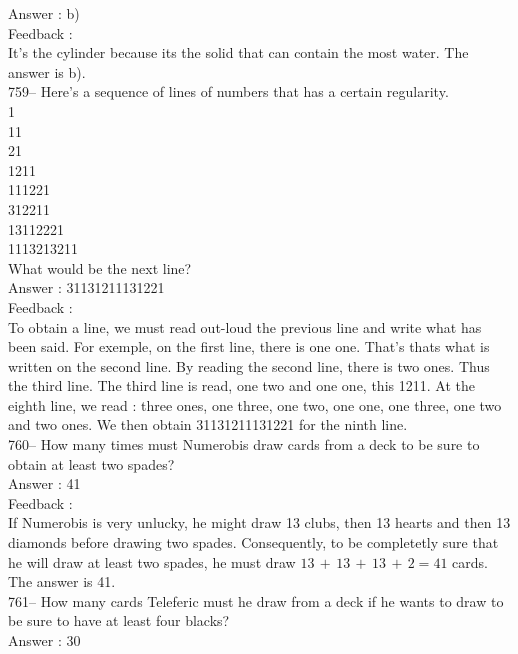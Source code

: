 \documentclass[letterpaper, 12pt]{article}
\begin{document}
Answer : b)\\

Feedback : \\
It's the cylinder because its the solid that can contain the most water.  The answer is b).\\

759-- Here's a sequence of lines of numbers that has a certain regularity.  \\
1\\
11\\
21\\
1211\\
111221\\
312211\\
13112221\\
1113213211\\

What would be the next line?\\

Answer : 31131211131221\\

Feedback : \\
To obtain a line, we must read out-loud the previous line and write what has been said. For exemple, on the first line, there is one one. That's thats what is written on the second line. By reading the second line, there is two ones. Thus the third line. The third line is read, one two and one one, this 1211. At the eighth line, we read : three ones, one three, one two, one one, one three, one two and two ones. We then obtain 31131211131221 for the ninth line.\\


760--  How many times must Numerobis draw cards from a deck to be sure to obtain at least two spades?\\

Answer : 41\\

Feedback : \\
If Numerobis is very unlucky, he might draw 13 clubs, then 13 hearts and then 13 diamonds before drawing two spades. Consequently, to be completetly sure that he will draw at least two spades, he must draw $13\,+\,13\,+\,13\,+\,2=41$ cards. The answer is 41.\\

761-- How many cards Teleferic must he draw from a deck if he wants to draw to be sure to have at least four blacks?\\

Answer : 30\\
\end{document}

